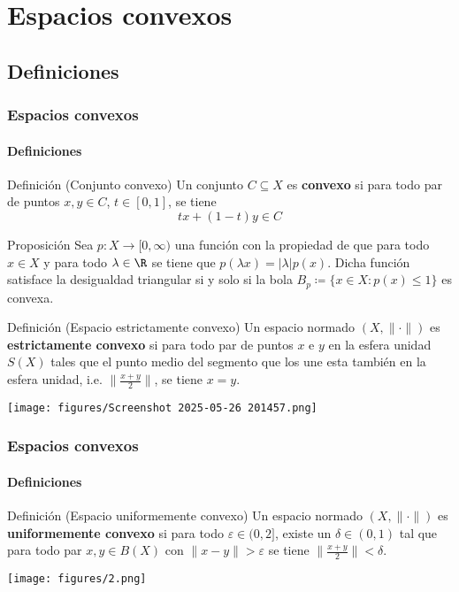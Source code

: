 \documentclass[aspectratio=169]{beamer}
\title{\projecttitle}
\subtitle{Curso Avanzado de Análisis - \institution}
\author{\authorname}
\date{Martes $27$ de mayo de 2025}
\begin{document}
\frame{\titlepage}


\section{Espacios convexos}
\subsection{Definiciones}
\begin{frame}
  \frametitle{Espacios convexos}
  \framesubtitle{Definiciones}
  \begin{block}{Definición (Conjunto convexo)}
    Un conjunto $ C \subseteq X $ es {\bf convexo} si para todo par de puntos $ x, y \in C $, $ t \in [0, 1] $, se tiene
    \begin{equation}
      tx + (1-t)y \in C
    \end{equation}
  \end{block}
  \begin{block}{Proposición}
    Sea $ p \colon X \to [0,\infty) $ una función con la propiedad de que para todo $ x \in X $ y para todo $ \lambda \in \R $ se tiene que $ p(\lambda x) = |\lambda| p(x) $. Dicha función satisface la desigualdad triangular si y solo si la bola  $B_p \coloneq \{ x \in X \colon p(x) \leq 1 \} $ es convexa.
  \end{block}
\end{frame}

\begin{frame}
  \begin{block}{Definición (Espacio estrictamente convexo)}
    Un espacio normado $ (X, \| \cdot \|) $ es {\bf estrictamente convexo} si para todo par de puntos $ x $ e $ y $ en la esfera unidad $ S(X) $ tales que el punto medio del segmento que los une esta también en la esfera unidad, i.e. $\| \frac{x+y}{2}\| $, se tiene $ x = y $.
  \end{block}
  \centering
  \texttt{[image: figures/Screenshot 2025-05-26 201457.png]}
\end{frame}

\begin{frame}
  \frametitle{Espacios convexos}
  \framesubtitle{Definiciones}
  \begin{block}{Definición (Espacio uniformemente convexo)}
    Un espacio normado $ (X, \| \cdot \|) $ es {\bf uniformemente convexo} si para todo $ \varepsilon \in (0, 2] $, existe un $ \delta \in (0, 1) $ tal que para todo par $ x, y \in B(X) $ con $ \| x - y \| > \varepsilon $ se tiene $ \| \frac{x+y}{2} \| < \delta $.
  \end{block}
  \centering
  \texttt{[image: figures/2.png]}
\end{frame}
\end{document}
